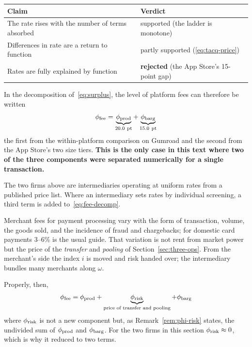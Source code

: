 \begin{center}
\begin{tabularx}{\textwidth}{@{}Xl@{}}
\toprule
Claim & Verdict \\
\midrule
The rate rises with the number of terms absorbed & supported (the ladder is monotone) \\
Differences in rate are a return to function & partly supported (\eqref{eq:tacq-price}) \\
Rates are fully explained by function & \textbf{rejected} (the App Store's 15-point gap) \\
\bottomrule
\end{tabularx}
\label{tab:predC-verdict}
\end{center}

In the decomposition of~\eqref{eq:surplus}, the level of platform fees can therefore be
written
\begin{equation}
\phi_{\text{fee}} = \underbrace{\phi_{\rm prod}}_{20.0\ \text{pt}} + \underbrace{\phi_{\rm barg}}_{15.0\ \text{pt}}
\label{eq:fee-decomp}
\end{equation}
the first from the within-platform comparison on Gumroad and the second from the App Store's
two size tiers.
\textbf{This is the only case in this text where two of the three components were separated
numerically for a single transaction.}

\begin{remark}
\label{rem:fee-incomplete}
The two firms above are intermediaries operating at uniform rates from a published price
list. Where an intermediary sets rates by individual screening, a third term is added
to~\eqref{eq:fee-decomp}.

Merchant fees for payment processing vary with the form of transaction, volume, the goods
sold, and the incidence of fraud and chargebacks; for domestic card payments 3--6\% is the
usual guide. That variation is not rent from market power but the price of the
\emph{transfer} and \emph{pooling} of Section~\ref{sec:three-ops}. From the merchant's side
the index $i$ is moved and risk handed over; the intermediary bundles many merchants along
$\omega$.

Properly, then,
\begin{equation}
\phi_{\text{fee}} = \phi_{\rm prod} + \underbrace{\phi_{\rm risk}}_{\text{price of transfer and pooling}} + \phi_{\rm barg}
\label{eq:fee-decomp3}
\end{equation}
where $\phi_{\rm risk}$ is not a new component but, as Remark~\ref{rem:phi-risk} states, the
undivided sum of $\phi_{\rm prod}$ and $\phi_{\rm barg}$. For the two firms in this section
$\phi_{\rm risk}\approx 0$, which is why it reduced to two terms.
\end{remark}


